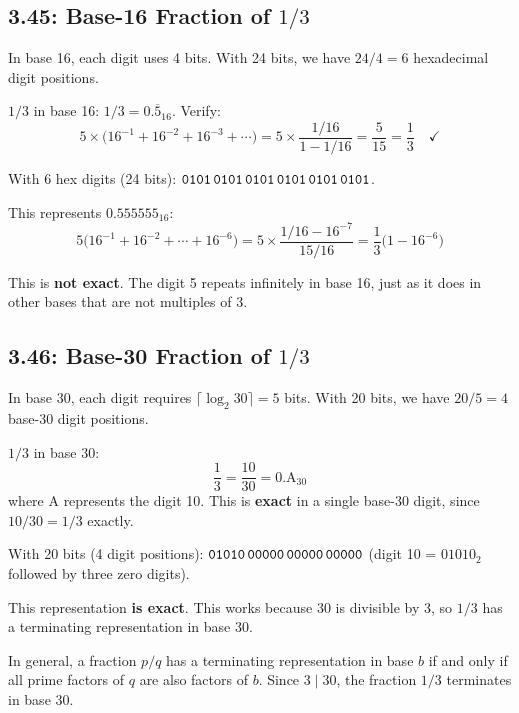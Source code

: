\subsection*{3.45: Base-16 Fraction of $1/3$}
\hypertarget{sol-3.45}{}

In base 16, each digit uses 4 bits. With 24 bits, we have $24/4 = 6$
hexadecimal digit positions.

$1/3$ in base 16: $1/3 = 0.\overline{5}_{16}$. Verify:
\[
  5 \times \bigl(16^{-1} + 16^{-2} + 16^{-3} + \cdots\bigr)
  = 5 \times \frac{1/16}{1 - 1/16}
  = \frac{5}{15}
  = \frac{1}{3} \quad\checkmark
\]

With 6 hex digits (24 bits): $\texttt{0101\,0101\,0101\,0101\,0101\,0101}$.

This represents $0.555555_{16}$:
\[
  5\bigl(16^{-1} + 16^{-2} + \cdots + 16^{-6}\bigr)
  = 5 \times \frac{1/16 - 16^{-7}}{15/16}
  = \frac{1}{3}\bigl(1 - 16^{-6}\bigr)
\]

This is \textbf{not exact}. The digit 5 repeats infinitely in base 16, just
as it does in other bases that are not multiples of 3.

\subsection*{3.46: Base-30 Fraction of $1/3$}
\hypertarget{sol-3.46}{}

In base 30, each digit requires $\lceil \log_2 30 \rceil = 5$ bits. With 20
bits, we have $20/5 = 4$ base-30 digit positions.

$1/3$ in base 30:
\[
  \frac{1}{3} = \frac{10}{30} = 0.\text{A}_{30}
\]
where A represents the digit 10. This is \textbf{exact} in a single base-30
digit, since $10/30 = 1/3$ exactly.

With 20 bits (4 digit positions): $\texttt{01010\,00000\,00000\,00000}$
(digit 10 = $01010_2$ followed by three zero digits).

This representation \textbf{is exact}. This works because 30 is divisible by 3,
so $1/3$ has a terminating representation in base 30.

In general, a fraction $p/q$ has a terminating representation in base $b$ if and
only if all prime factors of $q$ are also factors of $b$. Since $3 \mid 30$, the
fraction $1/3$ terminates in base 30.

